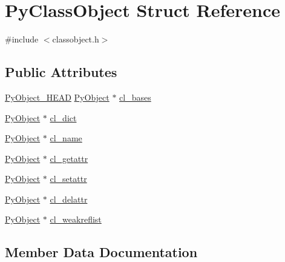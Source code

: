 \hypertarget{struct_py_class_object}{}\section{Py\+Class\+Object Struct Reference}
\label{struct_py_class_object}


{\ttfamily \#include $<$classobject.\+h$>$}

\subsection*{Public Attributes}
\begin{DoxyCompactItemize}
\item 
\mbox{\hyperlink{_python27_2object_8h_a0bf35c1f3ea13f925de94d8593db3b7e}{Py\+Object\+\_\+\+H\+E\+AD}} \mbox{\hyperlink{_python27_2object_8h_aadc84ac7aed2cfa6f20c25f62bf3dac7}{Py\+Object}} $\ast$ \mbox{\hyperlink{struct_py_class_object_a6113e935baa8eddd19e26430bc69f7ad}{cl\+\_\+bases}}
\item 
\mbox{\hyperlink{_python27_2object_8h_aadc84ac7aed2cfa6f20c25f62bf3dac7}{Py\+Object}} $\ast$ \mbox{\hyperlink{struct_py_class_object_a75d42d7a8852488ef6a82316d17d7f99}{cl\+\_\+dict}}
\item 
\mbox{\hyperlink{_python27_2object_8h_aadc84ac7aed2cfa6f20c25f62bf3dac7}{Py\+Object}} $\ast$ \mbox{\hyperlink{struct_py_class_object_a46c243fe2ac225212f110a20bd154cc3}{cl\+\_\+name}}
\item 
\mbox{\hyperlink{_python27_2object_8h_aadc84ac7aed2cfa6f20c25f62bf3dac7}{Py\+Object}} $\ast$ \mbox{\hyperlink{struct_py_class_object_ac4b73e1e13fd4b552fa1a855f8c39e61}{cl\+\_\+getattr}}
\item 
\mbox{\hyperlink{_python27_2object_8h_aadc84ac7aed2cfa6f20c25f62bf3dac7}{Py\+Object}} $\ast$ \mbox{\hyperlink{struct_py_class_object_a55c01b5e406db06f02e2fb3a4ced23d1}{cl\+\_\+setattr}}
\item 
\mbox{\hyperlink{_python27_2object_8h_aadc84ac7aed2cfa6f20c25f62bf3dac7}{Py\+Object}} $\ast$ \mbox{\hyperlink{struct_py_class_object_a3b5435af0279356ff435c02bec59aa18}{cl\+\_\+delattr}}
\item 
\mbox{\hyperlink{_python27_2object_8h_aadc84ac7aed2cfa6f20c25f62bf3dac7}{Py\+Object}} $\ast$ \mbox{\hyperlink{struct_py_class_object_a746fa446ca2f5455abe0634234133f3a}{cl\+\_\+weakreflist}}
\end{DoxyCompactItemize}


\subsection{Member Data Documentation}
\mbox{\label{struct_py_class_object_a6113e935baa8eddd19e26430bc69f7ad}} 
